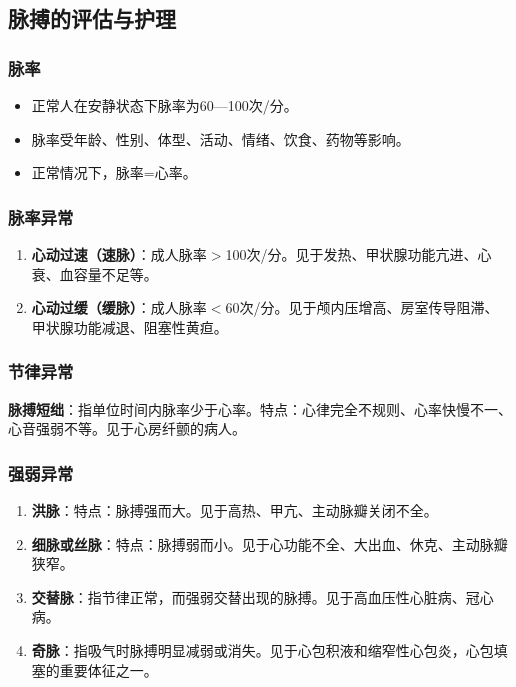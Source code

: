 \documentclass[11pt, a4paper]{ctexart}
\begin{document}
\subsection{脉搏的评估与护理}
\subsubsection{脉率}
\begin{itemize}
	\item 正常人在安静状态下脉率为60—100次/分。
	\item 脉率受年龄、性别、体型、活动、情绪、饮食、药物等影响。
	\item 正常情况下，脉率=心率。
\end{itemize}

\subsubsection{脉率异常}
\begin{enumerate}
	\item \textbf{心动过速（速脉）}：成人脉率$>$100次/分。见于发热、甲状腺功能亢进、心衰、血容量不足等。
	\item \textbf{心动过缓（缓脉）}：成人脉率$<$60次/分。见于颅内压增高、房室传导阻滞、甲状腺功能减退、阻塞性黄疸。
\end{enumerate}

\subsubsection{节律异常}
\textbf{脉搏短绌}：指单位时间内脉率少于心率。特点：心律完全不规则、心率快慢不一、心音强弱不等。见于心房纤颤的病人。

\subsubsection{强弱异常}
\begin{enumerate}
	\item \textbf{洪脉}：特点：脉搏强而大。见于高热、甲亢、主动脉瓣关闭不全。
	\item \textbf{细脉或丝脉}：特点：脉搏弱而小。见于心功能不全、大出血、休克、主动脉瓣狭窄。
	\item \textbf{交替脉}：指节律正常，而强弱交替出现的脉搏。见于高血压性心脏病、冠心病。
	\item \textbf{奇脉}：指吸气时脉搏明显减弱或消失。见于心包积液和缩窄性心包炎，心包填塞的重要体征之一。
\end{enumerate}
\end{document}
